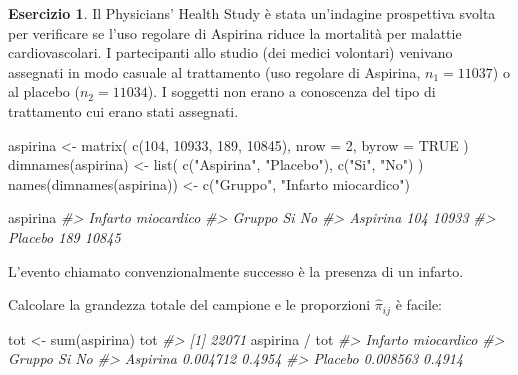 \documentclass[
  11pt,
]{krantz}
\makeatletter
\newenvironment{Shaded}{\begin{snugshade}}{\end{snugshade}}
\newcommand{\AttributeTok}[1]{\textcolor[rgb]{0.61,0.61,0.61}{#1}}
\newcommand{\CommentTok}[1]{\textcolor[rgb]{0.37,0.37,0.37}{\textit{#1}}}
\newcommand{\ConstantTok}[1]{\textcolor[rgb]{0,0,0}{#1}}
\newcommand{\DecValTok}[1]{\textcolor[rgb]{0.06,0.06,0.06}{#1}}
\newcommand{\FunctionTok}[1]{\textcolor[rgb]{0,0,0}{#1}}
\newcommand{\NormalTok}[1]{#1}
\newcommand{\OtherTok}[1]{\textcolor[rgb]{0.37,0.37,0.37}{#1}}
\newcommand{\SpecialCharTok}[1]{\textcolor[rgb]{0,0,0}{#1}}
\newcommand{\StringTok}[1]{\textcolor[rgb]{0.5,0.5,0.5}{#1}}
\newenvironment{kframe}{%
\medskip{}
\setlength{\fboxsep}{.8em}
 \def\at@end@of@kframe{}%
 \ifinner\ifhmode%
  \def\at@end@of@kframe{\end{minipage}}%
  \begin{minipage}{\columnwidth}%
 \fi\fi%
 \def\FrameCommand##1{\hskip\@totalleftmargin \hskip-\fboxsep
 \colorbox{shadecolor}{##1}\hskip-\fboxsep
     \hskip-\linewidth \hskip-\@totalleftmargin \hskip\columnwidth}%
 \MakeFramed {\advance\hsize-\width
   \@totalleftmargin\z@ \linewidth\hsize
   \@setminipage}}%
 {\par\unskip\endMakeFramed%
 \at@end@of@kframe}
\renewenvironment{Shaded}{\begin{kframe}}{\end{kframe}}
\theoremstyle{definition}
\theoremstyle{definition}
\theoremstyle{definition}
\newtheorem{exercise}{Esercizio}[chapter]
\theoremstyle{definition}
\theoremstyle{remark}
\makeatother
\begin{document}
\begin{exercise}
Il Physicians' Health Study è stata un'indagine prospettiva svolta per verificare se l'uso regolare di Aspirina riduce la mortalità per malattie cardiovascolari. I partecipanti allo studio (dei medici volontari) venivano assegnati in modo casuale al trattamento (uso regolare di Aspirina, \(n_1=11037\)) o al placebo (\(n_2=11034\)). I soggetti non erano a conoscenza del tipo di trattamento cui erano stati assegnati.

\begin{Shaded}
\begin{Highlighting}[]
\NormalTok{aspirina }\OtherTok{\textless{}{-}} \FunctionTok{matrix}\NormalTok{(}
  \FunctionTok{c}\NormalTok{(}\DecValTok{104}\NormalTok{, }\DecValTok{10933}\NormalTok{, }\DecValTok{189}\NormalTok{, }\DecValTok{10845}\NormalTok{),}
  \AttributeTok{nrow =} \DecValTok{2}\NormalTok{,}
  \AttributeTok{byrow =} \ConstantTok{TRUE}
\NormalTok{)}
\FunctionTok{dimnames}\NormalTok{(aspirina) }\OtherTok{\textless{}{-}} \FunctionTok{list}\NormalTok{(}
  \FunctionTok{c}\NormalTok{(}\StringTok{"Aspirina"}\NormalTok{, }\StringTok{"Placebo"}\NormalTok{),}
  \FunctionTok{c}\NormalTok{(}\StringTok{"Si"}\NormalTok{, }\StringTok{"No"}\NormalTok{)}
\NormalTok{)}
\FunctionTok{names}\NormalTok{(}\FunctionTok{dimnames}\NormalTok{(aspirina)) }\OtherTok{\textless{}{-}}
  \FunctionTok{c}\NormalTok{(}\StringTok{"Gruppo"}\NormalTok{, }\StringTok{"Infarto miocardico"}\NormalTok{)}

\NormalTok{aspirina}
\CommentTok{\#\textgreater{}           Infarto miocardico}
\CommentTok{\#\textgreater{} Gruppo      Si    No}
\CommentTok{\#\textgreater{}   Aspirina 104 10933}
\CommentTok{\#\textgreater{}   Placebo  189 10845}
\end{Highlighting}
\end{Shaded}

L'evento chiamato convenzionalmente successo è la presenza di un infarto.

Calcolare la grandezza totale del campione e le proporzioni \(\hat{\pi}_{ij}\) è facile:

\begin{Shaded}
\begin{Highlighting}[]
\NormalTok{tot }\OtherTok{\textless{}{-}} \FunctionTok{sum}\NormalTok{(aspirina)}
\NormalTok{tot}
\CommentTok{\#\textgreater{} [1] 22071}
\NormalTok{aspirina }\SpecialCharTok{/}\NormalTok{ tot}
\CommentTok{\#\textgreater{}           Infarto miocardico}
\CommentTok{\#\textgreater{} Gruppo           Si     No}
\CommentTok{\#\textgreater{}   Aspirina 0.004712 0.4954}
\CommentTok{\#\textgreater{}   Placebo  0.008563 0.4914}
\end{Highlighting}
\end{Shaded}


\end{exercise}
\end{document}
